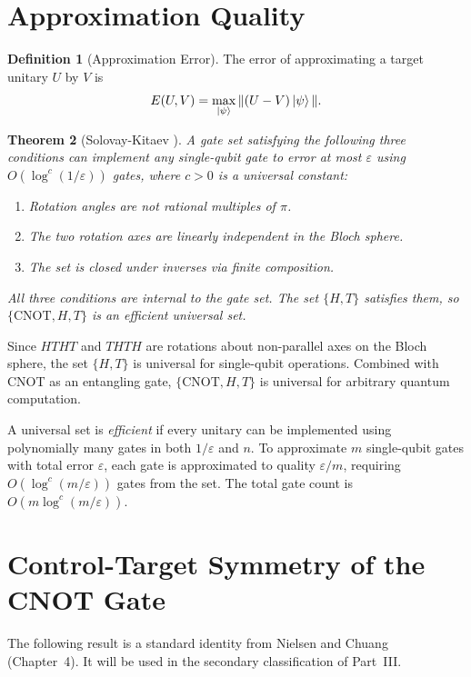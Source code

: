 \documentclass[12pt, a4paper, oneside]{report}
\theoremstyle{plain}
\newtheorem{theorem}{Theorem}[chapter]
\theoremstyle{definition}
\newtheorem{definition}[theorem]{Definition}
\theoremstyle{remark}
\newcommand{\CNOT}{\mathrm{CNOT}}
\begin{document}
\section{Approximation Quality}

\begin{definition}[Approximation Error]
The error of approximating a target unitary $U$ by $V$ is
\[
  E(U,V) = \max_{\ket{\psi}} \|(U-V)\ket{\psi}\|.
\]
\end{definition}

\begin{theorem}[Solovay-Kitaev {\cite{solovay-kitaev}}]
\label{thm:sk}
A gate set satisfying the following three conditions can implement any single-qubit gate to
error at most $\varepsilon$ using $O(\log^c(1/\varepsilon))$ gates, where $c > 0$ is a
universal constant:
\begin{enumerate}
  \item Rotation angles are not rational multiples of $\pi$.
  \item The two rotation axes are linearly independent in the Bloch sphere.
  \item The set is closed under inverses via finite composition.
\end{enumerate}
All three conditions are internal to the gate set. The set $\{H, T\}$ satisfies them, so
$\{\CNOT, H, T\}$ is an efficient universal set.
\end{theorem}

Since $HTHT$ and $THTH$ are rotations about non-parallel axes on the Bloch sphere, the set
$\{H,T\}$ is universal for single-qubit operations. Combined with CNOT as an entangling gate,
$\{\CNOT, H, T\}$ is universal for arbitrary quantum computation.

A universal set is \emph{efficient} if every unitary can be implemented using polynomially
many gates in both $1/\varepsilon$ and $n$. To approximate $m$ single-qubit gates with total
error $\varepsilon$, each gate is approximated to quality $\varepsilon/m$, requiring
$O(\log^c(m/\varepsilon))$ gates from the set. The total gate count is $O(m\log^c(m/\varepsilon))$.



\section{Control-Target Symmetry of the CNOT Gate}

The following result is a standard identity from Nielsen and Chuang~\cite{nielsen2000}
(Chapter~4). It will be used in the secondary classification of Part~III.
\end{document}
